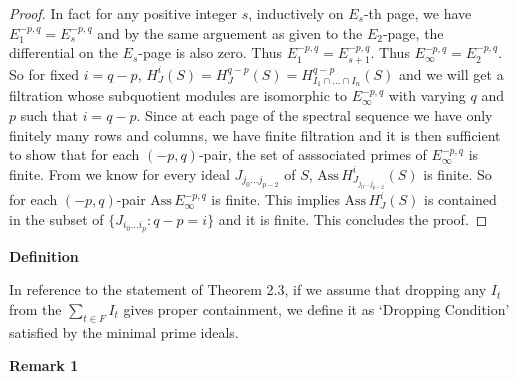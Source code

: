 \documentclass[10pt]{amsart}
\theoremstyle{plain}
\theoremstyle{definition}
\newcommand{\func}[1]{\mathrm{#1} \,}
\newcommand{\height}{\func{ht}}
\newcommand{\Ass}{\func{Ass}}
\begin{document}
\begin{proof}
In fact for any positive integer $s$, inductively on $E_s$-th page, we have $E_{1}^{-p,q}= E_s^{-p,q}$ and by the same arguement as given to the $E_2$-page, the differential on the $E_s$-page is also zero. Thus $E_{1}^{-p,q}= E_{s+1}^{-p,q}$. Thus $E_{\infty}^{-p,q}= E_2^{-p,q}$. So for fixed $i=q-p$, $H^{i}_{J}(S)= H^{q-p}_{J}(S)= H^{q-p}_{I_1\cap\dots\cap I_n}(S)$ and we will get a filtration whose subquotient modules are isomorphic to $E_{\infty}^{-p,q}$ with varying $q$ and $p$ such that $i=q-p$. Since at each page of the spectral sequence we have only finitely many rows and columns, we have finite filtration and it is then sufficient to show that for each $(-p,q)$-pair, the set of asssociated primes of $E_{\infty}^{-p,q}$ is finite. From \cite{Mar} we know for every ideal $J_{j_0\ldots j_{p-2}}$ of $S$, $\Ass H^i_{J_{j_0\ldots j_{p-2}}}(S)$ is finite. So for each $(-p,q)$-pair $\Ass E_{\infty}^{-p,q}$ is finite. This implies $\Ass H^i_{J}(S)$ is contained in the subset of $\{J_{i_0\ldots i_p}:q-p=i\}$ and it is finite. This concludes the proof. 
\end{proof}

{\bf Definition}

In reference to the statement of Theorem 2.3, if we assume that dropping any $I_t$ from the $\sum_{t\in F}I_t$ gives proper containment, we define it as `Dropping Condition' satisfied by the minimal prime ideals.

{\bf Remark 1}\\
\end{document}
